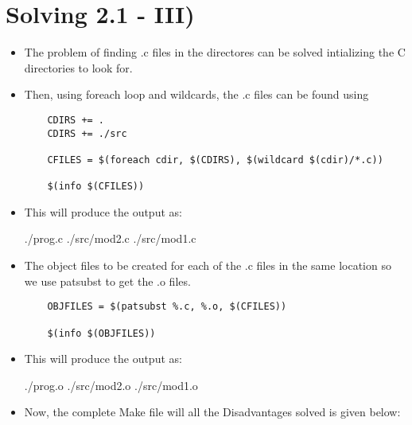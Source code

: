 \documentclass{article}
\begin{document}
\section{Solving 2.1 - III)}
\begin{itemize}
    \item The problem of finding .c files in the directores can be solved intializing the C directories to look for.
    \item Then, using foreach loop and wildcards, the .c files can be found using
          \begin{verbatim}
    CDIRS += .
    CDIRS += ./src
    
    CFILES = $(foreach cdir, $(CDIRS), $(wildcard $(cdir)/*.c))

    $(info $(CFILES))
    \end{verbatim}
    \item This will produce the output as:
          \begin{framed}
              ./prog.c  ./src/mod2.c ./src/mod1.c
          \end{framed}
    \item The object files to be created for each of the .c files in the same location so we use patsubst to get the .o files.
          \begin{verbatim}
    OBJFILES = $(patsubst %.c, %.o, $(CFILES))

    $(info $(OBJFILES))
    \end{verbatim}
    \item This will produce the output as:
          \begin{framed}
              ./prog.o  ./src/mod2.o  ./src/mod1.o
          \end{framed}
    \item Now, the complete Make file will all the Disadvantages solved is given below:
\end{itemize}

\inputminted[linenos, breaklines, frame=lines]{make}{./Simple_MakeFileSystem_2_1_III/Makefile}
\end{document}
